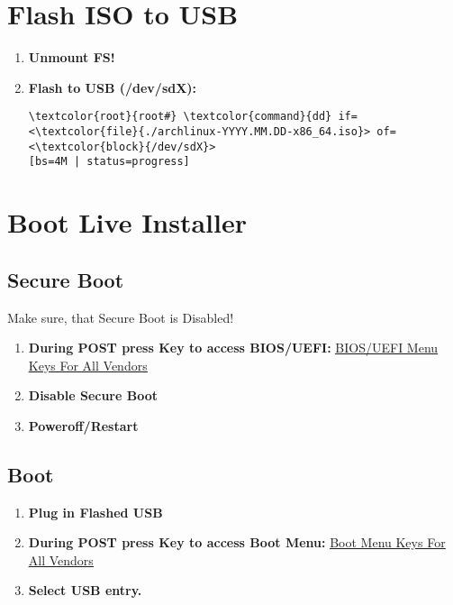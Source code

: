 \documentclass[10pt, a4paper, onecolumn, openany]{book} %
\begin{document}
\section{Flash ISO to USB}
\begin{enumerate}
    \item \textbf{Unmount FS!}
    \item \textbf{Flash to USB (/dev/sdX):}
\begin{Verbatim}[commandchars=\\\{\}]
\textcolor{root}{root#} \textcolor{command}{dd} if=<\textcolor{file}{./archlinux-YYYY.MM.DD-x86_64.iso}> of=<\textcolor{block}{/dev/sdX}> 
[bs=4M | status=progress]
\end{Verbatim}
\end{enumerate}
\section{Boot Live Installer}
\subsection{Secure Boot}
Make sure, that Secure Boot is Disabled!
\begin{enumerate}
    \item \textbf{During POST press Key to access BIOS/UEFI:}
\newline \underline{\href{https://techofide.com/blogs/boot-menu-option-keys-for-all-computers-and-laptops-updated-list-2021-techofide/}{BIOS/UEFI Menu Keys For All Vendors}}
    \item \textbf{Disable Secure Boot}
    \item \textbf{Poweroff/Restart}
\end{enumerate}
\subsection{Boot}
\begin{enumerate}
    \item \textbf{Plug in Flashed USB}
    \item \textbf{During POST press Key to access Boot Menu:}
\newline \underline{\href{https://techofide.com/blogs/boot-menu-option-keys-for-all-computers-and-laptops-updated-list-2021-techofide/}{Boot Menu Keys For All Vendors}}
    \item \textbf{Select USB entry.}
\end{enumerate}
\end{document}
